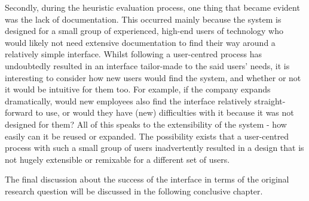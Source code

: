 Secondly, during the heuristic evaluation process, one thing that became evident was the lack of documentation. This occurred mainly because the system is designed for a small group of experienced, high-end users of technology who would likely not need extensive documentation to find their way around a relatively simple interface.  Whilst following a user-centred process has undoubtedly resulted in an interface tailor-made to the said users' needs, it is interesting to consider how new users would find the system, and whether or not it would be intuitive for them too. For example, if the company expands dramatically, would new employees also find the interface relatively straight-forward to use, or would they have (new) difficulties with it because it was not designed for them? All of this speaks to the extensibility of the system - how easily can it be reused or expanded. The possibility exists that a user-centred process with such a small group of users inadvertently resulted in a design that is not hugely extensible or remixable for a different set of users.


The final discussion about the success of the interface in terms of the original research question will be discussed in the following conclusive chapter. 


